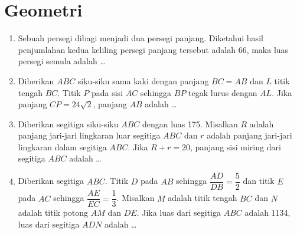 \documentclass[12pt]{scrartcl}
\begin{document}
\section{Geometri}
\begin{enumerate}[resume]
	\item Sebuah persegi dibagi menjadi dua persegi panjang. Diketahui hasil penjumlahan kedua
	keliling persegi panjang tersebut adalah 66, maka luas persegi semula adalah \dots

	\item Diberikan $ABC$ siku-siku sama kaki dengan panjang $BC=AB$ dan $L$ titik tengah $BC$.
	Titik $P$ pada sisi $AC$ sehingga $BP$ tegak lurus dengan $AL$.
	Jika panjang $CP=24\sqrt{2}$, panjang $AB$ adalah \dots

	\item Diberikan segitiga siku-siku $ABC$ dengan luas 175. Misalkan $R$ adalah panjang jari-jari
	lingkaran luar segitiga $ABC$ dan $r$ adalah panjang jari-jari lingkaran dalam segitiga $ABC$.
	Jika $R+r=20$, panjang sisi miring dari segitiga $ABC$ adalah \dots

	\item Diberikan segitiga $ABC$. Titik $D$ pada $AB$ sehingga $\dfrac{AD}{DB}=\dfrac{5}{2}$ dan
	titik $E$ pada $AC$ sehingga $\dfrac{AE}{EC}=\dfrac{1}{3}$. Misalkan $M$ adalah titik tengah $BC$
	dan $N$ adalah titik potong $AM$ dan $DE$. Jika luas dari segitiga $ABC$ adalah 1134,
	luas dari segitiga $ADN$ adalah \dots
\end{enumerate}

\end{document}
